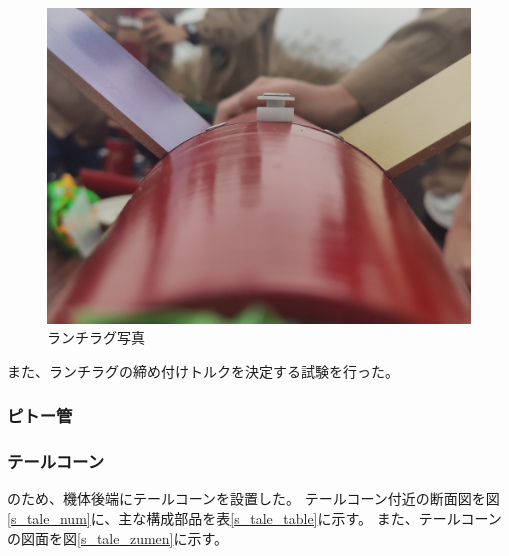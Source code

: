 \documentclass[a4paper,11pt,titlepage,uplatex]{jsarticle}
\begin{document}
\begin{figure}[H]
    \centering
    \includegraphics[scale = 0.1]{pic_str/s_lanch_pic.jpg}
    \caption{ランチラグ写真}
    \label{s_lan_pic}
\end{figure}


また、ランチラグの締め付けトルクを決定する試験を行った。



\subsubsection{ピトー管}
\label{pito}



\subsubsection{テールコーン}
\label{tale}

のため、機体後端にテールコーンを設置した。
テールコーン付近の断面図を図\ref{s_tale_num}に、主な構成部品を表\ref{s_tale_table}に示す。
また、テールコーンの図面を図\ref{s_tale_zumen}に示す。
\end{document}
